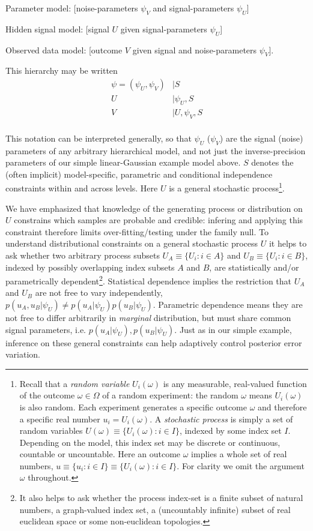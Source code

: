 \documentclass{article}
\begin{document}
Parameter model: [noise-parameters $\psi_V$ and signal-parameters $\psi_U$]

Hidden signal model: [signal $U$ given signal-parameters $\psi_U$]

Observed data model: [outcome $V$ given signal and noise-parameters $\psi_V$].

This hierarchy may be written 
\begin{equation} \label{eq1}
\begin{split}
\psi = (\psi_U , \psi_V) & | S\\
U & | \psi_U, S\\
V & |U, \psi_V, S\\
\end{split}
\end{equation}

This notation can be interpreted generally, so that $\psi_U$ ($\psi_V$) are the signal (noise) parameters of any arbitrary hierarchical model, and not just the inverse-precision parameters of our simple linear-Gaussian example model above. $S$ denotes the (often implicit) model-specific, parametric and conditional independence constraints within and across levels. Here $U$ is  a general stochastic process\footnote{Recall that a \textit{random variable} $U_i(\omega)$ is any measurable, real-valued function of the outcome $\omega \in \Omega$ of a random experiment: the random $\omega$ means $U_i(\omega)$ is also random. Each experiment generates a specific outcome $\omega$ and therefore a specific real number $u_i = U_i(\omega)$. A \textit{stochastic process} is simply a set of random variables $U(\omega) \equiv \{U_i(\omega): i \in I\}$, indexed by some index set $I$. Depending on the model, this index set may be discrete or continuous, countable or uncountable. Here an outcome $\omega$ implies a whole set of real numbers, $u \equiv \{ u_i : i \in I \} \equiv \{U_i(\omega): i \in I\}$. For clarity we omit the argument $\omega$ throughout.}.

We have emphasized that knowledge of the generating process or distribution on $U$ constrains which samples are probable and credible: infering and applying this constraint therefore limits over-fitting/testing under the family null. To understand distributional constraints on a general stochastic process $U$ it helps to ask whether two arbitrary process subsets $U_A \equiv \{U_i: i \in A \}$ and $U_B \equiv \{U_i: i \in B \}$, indexed by possibly overlapping index subsets $A$ and $B$, are statistically and/or parametrically dependent\footnote{It also helps to ask whether the process index-set is a finite subset of natural numbers, a graph-valued index set, a (uncountably infinite) subset of real euclidean space or some non-euclidean topologies.}. Statistical dependence implies the restriction that $U_A$ and $U_B$ are not free to vary independently, $p(u_A,u_B|\psi_U) \neq p(u_A|\psi_U)p(u_B|\psi_U)$. Parametric dependence means they are not free to differ arbitrarily in \textit{marginal} distribution, but must share common signal parameters, i.e. $p(u_A|\psi_U), p(u_B|\psi_U)$. Just as in our simple example, inference on these general constraints can help adaptively control posterior error variation. 
\end{document}
